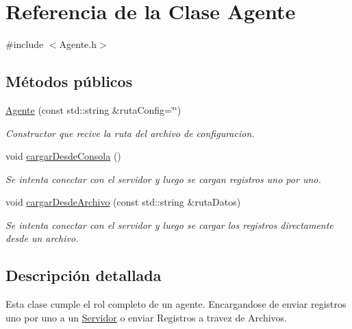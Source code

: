 \hypertarget{classAgente}{\section{\-Referencia de la \-Clase \-Agente}
\label{classAgente}
}


{\ttfamily \#include $<$\-Agente.\-h$>$}

\subsection*{\-Métodos públicos}
\begin{DoxyCompactItemize}
\item 
\hyperlink{classAgente_a85f3ede45fe8c713306a1b342413c692}{\-Agente} (const std\-::string \&ruta\-Config=\char`\"{}\char`\"{})
\begin{DoxyCompactList}\small\item\em \-Constructor que recive la ruta del archivo de configuracion. \end{DoxyCompactList}\item 
\hypertarget{classAgente_a2c1bbeaa1f77734741b15999f8459871}{void \hyperlink{classAgente_a2c1bbeaa1f77734741b15999f8459871}{cargar\-Desde\-Consola} ()}\label{classAgente_a2c1bbeaa1f77734741b15999f8459871}

\begin{DoxyCompactList}\small\item\em \-Se intenta conectar con el servidor y luego se cargan registros uno por uno. \end{DoxyCompactList}\item 
void \hyperlink{classAgente_a2441654a1842994e9b31a04f66bc6eaf}{cargar\-Desde\-Archivo} (const std\-::string \&ruta\-Datos)
\begin{DoxyCompactList}\small\item\em \-Se intenta conectar con el servidor y luego se cargar los registros directamente desde un archivo. \end{DoxyCompactList}\end{DoxyCompactItemize}


\subsection{\-Descripción detallada}
\-Esta clase cumple el rol completo de un agente. \-Encargandose de enviar registros uno por uno a un \hyperlink{classServidor}{\-Servidor} o enviar \-Registros a travez de \-Archivos. 

